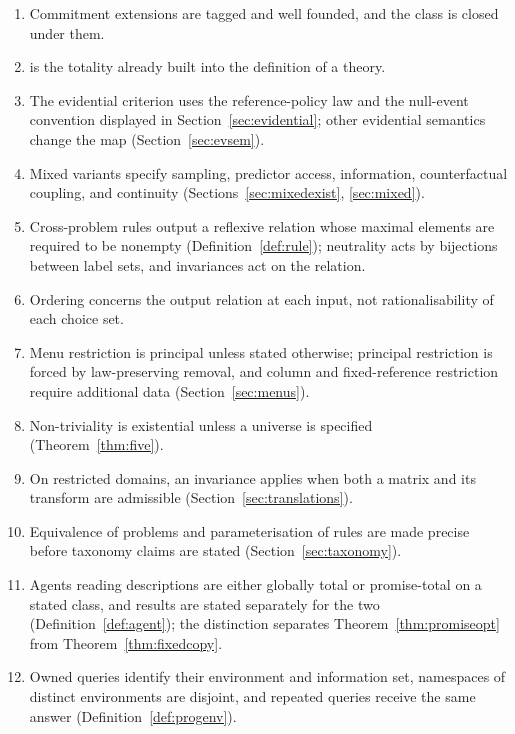 \begin{enumerate}[label=\arabic*.,ref=\arabic*,leftmargin=2em,itemsep=.3em]
        uses a specified coupling and structural state set (Definition~\ref{def:commit},
        Section~\ref{sec:couplings}).
  \item Commitment extensions are tagged and well founded, and the class is closed under them.
  \item {} is the totality already built into the definition of a theory.
  \item The evidential criterion uses the reference-policy law and the null-event convention displayed in
        Section~\ref{sec:evidential}; other evidential semantics change the map (Section~\ref{sec:evsem}).
  \item Mixed variants specify sampling, predictor access, information, counterfactual coupling, and
        continuity (Sections~\ref{sec:mixedexist}, \ref{sec:mixed}).
  \item Cross-problem rules output a reflexive relation whose maximal elements are required to be nonempty
        (Definition~\ref{def:rule}); neutrality acts by bijections between label sets, and invariances act
        on the relation.
  \item Ordering concerns the output relation at each input, not rationalisability of each choice set.
  \item Menu restriction is principal unless stated otherwise; principal restriction is forced by
        law-preserving removal, and column and fixed-reference restriction require additional data
        (Section~\ref{sec:menus}).
  \item Non-triviality is existential unless a universe is specified (Theorem~\ref{thm:five}).
  \item On restricted domains, an invariance applies when both a matrix and its transform are admissible
        (Section~\ref{sec:translations}).
  \item Equivalence of problems and parameterisation of rules are made precise before taxonomy claims are
        stated (Section~\ref{sec:taxonomy}).
  \item Agents reading descriptions are either globally total or promise-total on a stated class, and
        results are stated separately for the two (Definition~\ref{def:agent}); the distinction
        separates Theorem~\ref{thm:promiseopt} from Theorem~\ref{thm:fixedcopy}.
  \item Owned queries identify their environment and information set, namespaces of distinct
        environments are disjoint, and repeated queries receive the same answer
        (Definition~\ref{def:progenv}).

\end{enumerate}
